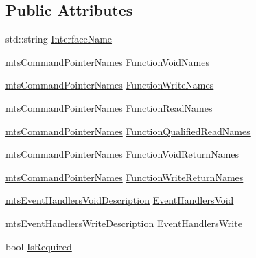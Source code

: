 \subsection*{Public Attributes}
\begin{DoxyCompactItemize}
\item 
std\+::string \hyperlink{classmts_interface_required_description_a8ef893e8fc8881d31e85060b9d72fb84}{Interface\+Name}
\item 
\hyperlink{mts_interface_common_8h_a19f2c08080081cfd55cf64a7a5fc66cd}{mts\+Command\+Pointer\+Names} \hyperlink{classmts_interface_required_description_acb503c6d1cc90d02415fad8a5f9b6256}{Function\+Void\+Names}
\item 
\hyperlink{mts_interface_common_8h_a19f2c08080081cfd55cf64a7a5fc66cd}{mts\+Command\+Pointer\+Names} \hyperlink{classmts_interface_required_description_ab1a5d3c1ec18381021218a70864088cb}{Function\+Write\+Names}
\item 
\hyperlink{mts_interface_common_8h_a19f2c08080081cfd55cf64a7a5fc66cd}{mts\+Command\+Pointer\+Names} \hyperlink{classmts_interface_required_description_aa6e97799254bced249ae10abeca0553a}{Function\+Read\+Names}
\item 
\hyperlink{mts_interface_common_8h_a19f2c08080081cfd55cf64a7a5fc66cd}{mts\+Command\+Pointer\+Names} \hyperlink{classmts_interface_required_description_ac5da751a184876eebbd9eb3c30319137}{Function\+Qualified\+Read\+Names}
\item 
\hyperlink{mts_interface_common_8h_a19f2c08080081cfd55cf64a7a5fc66cd}{mts\+Command\+Pointer\+Names} \hyperlink{classmts_interface_required_description_add8ee8d91fbc554de70b8ec932ce0d51}{Function\+Void\+Return\+Names}
\item 
\hyperlink{mts_interface_common_8h_a19f2c08080081cfd55cf64a7a5fc66cd}{mts\+Command\+Pointer\+Names} \hyperlink{classmts_interface_required_description_a3b8f038c5695fa5811879606e9f8de9e}{Function\+Write\+Return\+Names}
\item 
\hyperlink{mts_interface_common_8h_a5f4e10ae813c8f00dc5f2a5af3be07aa}{mts\+Event\+Handlers\+Void\+Description} \hyperlink{classmts_interface_required_description_a47eb0712a0144d7accf7cd4e52a07468}{Event\+Handlers\+Void}
\item 
\hyperlink{mts_interface_common_8h_ad16a3044918ddd1cf5a6f63dc197f353}{mts\+Event\+Handlers\+Write\+Description} \hyperlink{classmts_interface_required_description_af605400a48cb18b6cddf841165f4d6ba}{Event\+Handlers\+Write}
\item 
bool \hyperlink{classmts_interface_required_description_ae56c8fe1cb63d5e712edb530c6d91f2c}{Is\+Required}
\end{DoxyCompactItemize}


